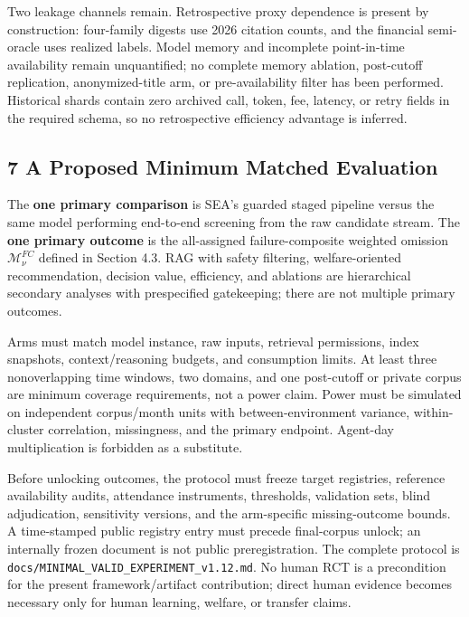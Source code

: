 \documentclass[
  11pt]{article}
\begin{document}
Two leakage channels remain. Retrospective proxy dependence is present
by construction: four-family digests use 2026 citation counts, and the
financial semi-oracle uses realized labels. Model memory and incomplete
point-in-time availability remain unquantified; no complete memory
ablation, post-cutoff replication, anonymized-title arm, or
pre-availability filter has been performed. Historical shards contain
zero archived call, token, fee, latency, or retry fields in the required
schema, so no retrospective efficiency advantage is inferred.

\subsection{7 A Proposed Minimum Matched
Evaluation}\label{a-proposed-minimum-matched-evaluation}

The \textbf{one primary comparison} is SEA's guarded staged pipeline
versus the same model performing end-to-end screening from the raw
candidate stream. The \textbf{one primary outcome} is the all-assigned
failure-composite weighted omission \(\mathcal M^{FC}_{\nu}\) defined in
Section 4.3. RAG with safety filtering, welfare-oriented recommendation,
decision value, efficiency, and ablations are hierarchical secondary
analyses with prespecified gatekeeping; there are not multiple primary
outcomes.

Arms must match model instance, raw inputs, retrieval permissions, index
snapshots, context/reasoning budgets, and consumption limits. At least
three nonoverlapping time windows, two domains, and one post-cutoff or
private corpus are minimum coverage requirements, not a power claim.
Power must be simulated on independent corpus/month units with
between-environment variance, within-cluster correlation, missingness,
and the primary endpoint. Agent-day multiplication is forbidden as a
substitute.

Before unlocking outcomes, the protocol must freeze target registries,
reference availability audits, attendance instruments, thresholds,
validation sets, blind adjudication, sensitivity versions, and the
arm-specific missing-outcome bounds. A time-stamped public registry
entry must precede final-corpus unlock; an internally frozen document is
not public preregistration. The complete protocol is
\texttt{docs/MINIMAL\_VALID\_EXPERIMENT\_v1.12.md}. No human RCT is a
precondition for the present framework/artifact contribution; direct
human evidence becomes necessary only for human learning, welfare, or
transfer claims.
\end{document}

